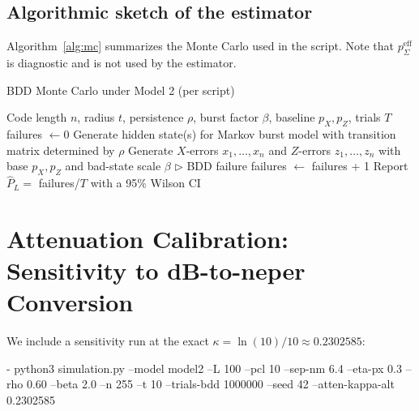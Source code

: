 \documentclass[conference]{IEEEtran}
\newcommand{\nexact}[1]{\num[round-mode=off]{#1}}
\newcommand{\simL}{100}
\newcommand{\simpcl}{10}
\newcommand{\simsep}{6.4}
\newcommand{\simeta}{0.3}
\newcommand{\simn}{255}
\newcommand{\simt}{10}
\newcommand{\simtrials}{1000000}
\newcommand{\simseed}{42}
\newcommand{\simrhoB}{0.60}
\newcommand{\simkappaExact}{0.2302585}
\begin{document}
\subsection{Algorithmic sketch of the estimator}
Algorithm~\ref{alg:mc} summarizes the Monte Carlo used in the script. Note that \(p_{\Sigma}^{\mathrm{eff}}\) is diagnostic and is not used by the estimator.

\begin{algorithm}[t!]
\small
\caption{BDD Monte Carlo under Model 2 (per script)}\label{alg:mc}
\begin{adjustbox}{width=\linewidth}
\begin{algorithmic}[1]
\Require Code length \(n\), radius \(t\), persistence \(\rho\), burst factor \(\beta\), baseline \(p_X,p_Z\), trials \(T\)
\State failures \(\gets 0\)
  \State Generate hidden state(s) for Markov burst model with transition matrix determined by \(\rho\)
  \State Generate \(X\)-errors \(x_1,\dots,x_n\) and \(Z\)-errors \(z_1,\dots,z_n\) with base \(p_X,p_Z\) and bad-state scale \(\beta\)
   \(\triangleright\) BDD failure
    \State failures \(\gets\) failures + 1
  \EndIf
\EndFor
\State Report \(\hat P_L=\) failures/\(T\) with a 95\% Wilson CI \cite{Wilson1927JASA}
\end{algorithmic}
\end{adjustbox}
\end{algorithm}

\section{Attenuation Calibration: Sensitivity to dB-to-neper Conversion}\label{sec:atten}
We include a sensitivity run at the exact \(\kappa=\ln(10)/10\approx\nexact{\simkappaExact}\):

- python3 simulation.py --model model2 --L \simL{} --pcl \simpcl{} --sep-nm \simsep{} --eta-px \simeta{} --rho \simrhoB{} --beta 2.0 --n \simn{} --t \simt{} --trials-bdd \simtrials{} --seed \simseed{} --atten-kappa-alt \simkappaExact
\end{document}
